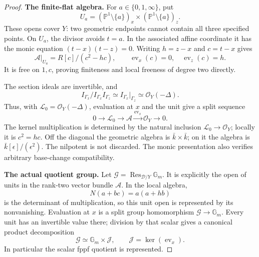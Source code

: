 \documentclass[11pt,a4paper]{article}
\newcommand{\mathscr}{\mathcal}
\theoremstyle{named}\newtheorem{finding}{Finding}[section]
\theoremstyle{definition}\newtheorem{definition}[finding]{Definition}
\theoremstyle{remark}\newtheorem{remark}[finding]{Remark}
\begin{document}
\begin{proof}
\par\smallskip\noindent\textbf{The finite-flat algebra.}\quad
For \(a\in\{0,1,\infty\}\), put
\[
 U_a=(\mathbb P^1\setminus\{a\})_x
                \times(\mathbb P^1\setminus\{a\})_z.
\]
These opens cover \(Y\): two geometric endpoints
cannot contain all three specified points.
On \(U_a\), the divisor avoids \(t=a\).
In the associated affine coordinate it has
the monic equation \((t-x)(t-z)=0\).
Writing \(h=z-x\) and \(c=t-x\) gives
\begin{equation}\label{eq:variableQuotientAlgebra}
 \mathcal A|_{U_a}=R[c]/(c^2-hc),\qquad
 \operatorname{ev}_x(c)=0,\quad
 \operatorname{ev}_z(c)=h.
\end{equation}
It is free on \(1,c\), proving finiteness and
local freeness of degree two directly.

The section ideals are invertible, and
\[
 I_{\Gamma_x}/I_{\Gamma_x}I_{\Gamma_z}
       \simeq I_{\Gamma_x}|_{\Gamma_z}
       \simeq\mathcal O_Y(-\Delta).
\]
Thus, with \(\mathcal L_0=\mathcal O_Y(-\Delta)\),
evaluation at \(x\) and the unit give a split sequence
\begin{equation}\label{eq:variableQuotientAugmentation}
 0\longrightarrow\mathcal L_0
 \longrightarrow\mathcal A
 \xrightarrow{\operatorname{ev}_x}\mathcal O_Y
 \longrightarrow0.
\end{equation}
The kernel multiplication is determined by the
natural inclusion \(\mathcal L_0\to\mathcal O_Y\);
locally it is \(c^2=hc\).
Off the diagonal the geometric algebra is
\(\bar k\times\bar k\); on it the algebra is
\(\bar k[\epsilon]/(\epsilon^2)\).
The nilpotent is not discarded.
The monic presentation also verifies arbitrary
base-change compatibility.

\par\smallskip\noindent\textbf{The actual quotient group.}\quad
Let \(\mathcal G=\operatorname{Res}_{\mathscr D/Y}\mathbb G_m\).
It is explicitly the open of units in the rank-two
vector bundle \(\mathcal A\). In the local algebra,
\[
                 N(a+bc)=a(a+hb)
\]
is the determinant of multiplication, so this
unit open is represented by its nonvanishing.
Evaluation at \(x\) is a split group homomorphism
\(\mathcal G\to\mathbb G_m\).
Every unit has an invertible value there; division
by that scalar gives a canonical product decomposition
\[
 \mathcal G\simeq\mathbb G_m\times\mathcal J,\qquad
 \mathcal J=\ker(\operatorname{ev}_x).
\]
In particular the scalar fppf quotient is represented.


\end{proof}
\end{document}
